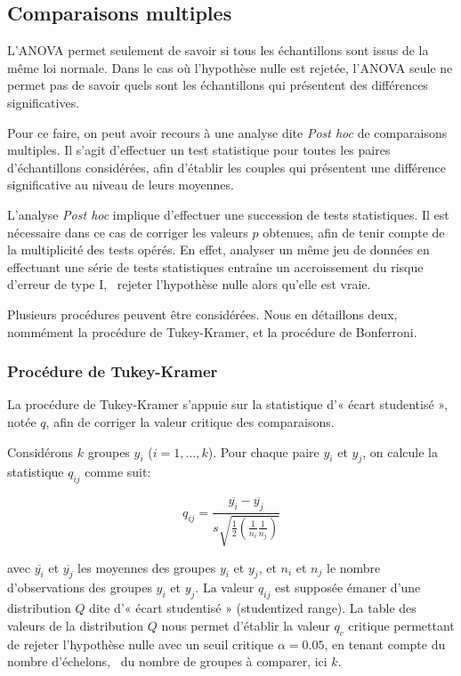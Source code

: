 \subsection*{Comparaisons multiples}

L'ANOVA permet seulement de savoir si tous les échantillons sont issus de la même loi normale. Dans le cas où l'hypothèse nulle est rejetée, l'ANOVA seule ne permet pas de savoir quels sont les échantillons qui présentent des différences significatives. 

Pour ce faire, on peut avoir recours à une analyse dite \emph{Post hoc} de comparaisons multiples. Il s'agit d'effectuer un test statistique pour toutes les paires d'échantillons considérées, afin d'établir les couples qui présentent une différence significative au niveau de leurs moyennes. 

L'analyse \emph{Post hoc} implique d'effectuer une succession de tests statistiques. Il est nécessaire dans ce cas de corriger les valeurs $p$ obtenues, afin de tenir compte de la multiplicité des tests opérés. En effet, analyser un même jeu de données en effectuant une série de tests statistiques entraîne un accroissement du risque d'erreur de type I, \ie~rejeter l'hypothèse nulle alors qu'elle est vraie.

Plusieurs procédures peuvent être considérées. Nous en détaillons deux, nommément la procédure de Tukey-Kramer, et la procédure de Bonferroni.

\subsubsection*{Procédure de Tukey-Kramer}
\label{app:tukey}

La procédure de Tukey-Kramer s'appuie sur la statistique d'« écart studentisé », notée $q$, afin de corriger la valeur critique des comparaisons. 

Considérons $k$ groupes $y_i$ ($i=1,\ldots,k$). Pour chaque paire $y_i$ et $y_j$, on calcule la statistique $q_{ij}$ comme suit: 

\begin{equation}
q_{ij}=\dfrac{\overline{y_{i}}-\overline{y_{j}}}{s\sqrt{\frac{1}{2}(\frac{1}{n_{i}} \frac{1}{n_{j}})}}
\end{equation}

avec $\overline{y_{i}}$ et $\overline{y_{j}}$ les moyennes des groupes $y_i$ et $y_j$, et $n_{i}$ et $n_{j}$ le nombre d'observations des groupes $y_{i}$ et $y_{j}$. La valeur $q_{ij}$ est supposée émaner d'une distribution $Q$ dite d'« écart studentisé » (studentized range). La table des valeurs de la distribution $Q$ nous permet d'établir la valeur $q_c$ critique permettant de rejeter l'hypothèse nulle avec un seuil critique $\alpha=0.05$, en tenant compte du nombre d'échelons, \ie~du nombre de groupes à comparer, ici $k$.

